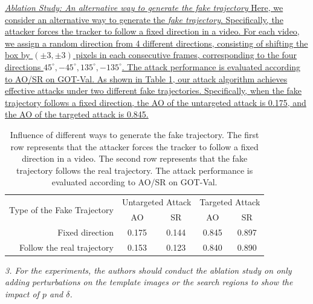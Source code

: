 \documentclass[12pt]{article}
\begin{document}
\uline{
\textit{Ablation Study: An alternative way to generate the fake trajectory}  Here, we consider an alternative way to generate the \textit{fake trajectory}. Specifically, the attacker forces the tracker to follow a fixed direction in a video. For each video, we assign a random direction from 4 different directions, consisting of shifting the box by $(\pm 3, \pm 3)$ pixels in each consecutive frames, corresponding to the four directions $45^{\circ}, -45^{\circ}, 135^{\circ}, -135^{\circ}$.
The attack performance is evaluated according to AO/SR on GOT-Val.
As shown in Table \ref{table:direction}, our attack algorithm achieves effective attacks under two different fake trajectories. Specifically, when the fake trajectory follows a fixed direction, the AO of the untargeted attack is 0.175, and the AO of the targeted attack is 0.845.
}

\begin{table}[t]
  \renewcommand\thetable{VIII}
  \centering
  \caption{Influence of different ways to generate the fake trajectory.
  The first row represents that the attacker forces the tracker to follow a fixed direction in a video.
  The second row represents that the fake trajectory follows the real trajectory. The attack performance is evaluated according to AO/SR on GOT-Val.}
  \begin{tabular}{@{}rcccc@{}}
  \toprule
  \multirow{2}{*}[-2pt]{Type of the Fake Trajectory} & \multicolumn{2}{c}{Untargeted Attack} & \multicolumn{2}{c}{Targeted Attack} \\ \cmidrule{2-5}
                              & AO                & SR                & AO               & SR               \\ \midrule
  Fixed direction             & 0.175             & 0.144             & 0.845            & 0.897            \\
  Follow the real trajectory      & 0.153             & 0.123             & 0.840            & 0.890            \\ \bottomrule        
  \end{tabular}
  \label{table:direction}
\end{table}

\textit{3. For the experiments, the authors should conduct the ablation study on only adding perturbations on the template images or the search regions to show the impact of $p$ and $\delta$.}
\end{document}

